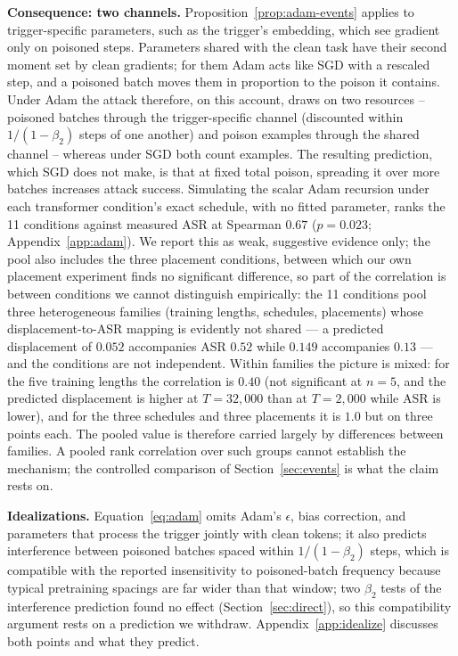 \documentclass{article} %
\begin{document}
\textbf{Consequence: two channels.} Proposition~\ref{prop:adam-events} applies to
trigger-specific parameters, such as the trigger's embedding, which see gradient only on
poisoned steps. Parameters shared with the clean task have their second moment set by
clean gradients; for them Adam acts like SGD with a rescaled step, and a poisoned batch
moves them in proportion to the poison it contains. Under Adam the attack therefore, on this account, draws on two resources -- poisoned batches through the trigger-specific channel
(discounted within $1/(1-\beta_2)$ steps of one another) and poison examples through the
shared channel -- whereas under SGD both count examples. The resulting prediction, which
SGD does not make, is that at fixed total poison, spreading it over more batches
increases attack success. Simulating the scalar Adam recursion under each transformer
condition's exact schedule, with no fitted parameter, ranks the 11 conditions against
measured ASR at Spearman $0.67$ ($p=0.023$; Appendix~\ref{app:adam}). We report this as weak, suggestive evidence only; the pool also includes the three placement conditions, between which our own placement experiment finds no significant difference, so part of the correlation is between conditions we cannot distinguish empirically: the 11 conditions pool three heterogeneous families
(training lengths, schedules, placements) whose displacement-to-ASR mapping is evidently
not shared --- a predicted displacement of $0.052$ accompanies ASR $0.52$ while $0.149$
accompanies $0.13$ --- and the conditions are not independent. Within families the picture is mixed: for the five training lengths the correlation is $0.40$ (not significant at $n=5$, and the predicted displacement is higher at $T=32{,}000$ than at $T=2{,}000$ while ASR is lower), and for the three schedules and three placements it is $1.0$ but on three points each. The pooled value is therefore carried largely by differences between families. A pooled rank correlation over such groups cannot establish the mechanism; the controlled comparison of
Section~\ref{sec:events} is what the claim rests on.

\textbf{Idealizations.} Equation~\ref{eq:adam} omits Adam's $\epsilon$, bias correction,
and parameters that process the trigger jointly with clean tokens; it also predicts
interference between poisoned batches spaced within $1/(1-\beta_2)$ steps, which is
compatible with the reported insensitivity to poisoned-batch frequency because typical
pretraining spacings are far wider than that window; two $\beta_2$ tests of the interference prediction found no effect (Section~\ref{sec:direct}), so this compatibility argument rests on a prediction we withdraw. Appendix~\ref{app:idealize}
discusses both points and what they predict.
\end{document}
